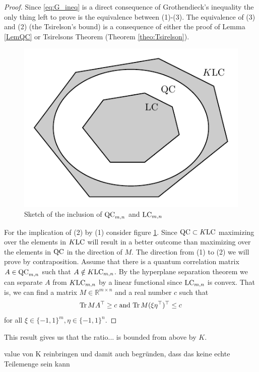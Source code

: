 	\begin{proof}
		Since \eqref{eq:G_ineq} is a direct consequence of Grothendieck's inequality the only thing left to prove is the equivalence between (1)-(3). The equivalence of (3) and (2) (the Tsirelson's bound) is a consequence of either the proof of Lemma \ref{LemQC} or Tsirelsons Theorem (Theorem \ref{theo:Tsirelson}).
		
		\begin{figure}
			\includegraphics[scale=1]{chapters/fig_QC&LC.pdf}
			\caption{Sketch of the inclusion of $\textup{QC}_{m,n}$ and $\textup{LC}_{m,n}$} \label{fig:QCLC}
		\end{figure}
		
		For the implication of (2) by (1) consider figure \ref{fig:QCLC}. Since $\textup{QC}\subset K\textup{LC}$ maximizing over the elements in $K\textup{LC}$ will result in a better outcome than maximizing over the elements in $\textup{QC}$ in the direction of $M$.
		The direction from (1) to (2) we will prove by contraposition. Assume that there is a quantum correlation matrix $A\in\textup{QC}_{m,n}$ such that $A\notin K\textup{LC}_{m,n}$. By the hyperplane separation theorem we can separate $A$ from $K\textup{LC}_{m,n}$ by a linear functional since $\textup{LC}_{m,n}$ is convex. That is, we can find a matrix $M\in\mathbb{R}^{m\times n}$ and a real number $c$ such that 
		\begin{equation*}
			\textup{Tr} \, {MA^\top}  \geq c \text{ and } \textup{Tr} \, {M(\xi\eta^\top)^\top} \leq c
		\end{equation*}
		for all $\xi\in\{-1,1\}^m,\eta\in\{-1,1\}^n$.
	\end{proof}
	
	This result gives us that the ratio... is bounded from above by $K$.
	
	value von K reinbringen und damit auch begründen, dass das keine echte Teilemenge sein kann
\newpage